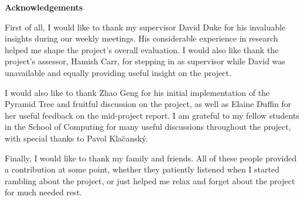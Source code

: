 \begin{center}
    {\LARGE\bf Acknowledgements}
\end{center}

First of all, I would like to thank my supervisor David Duke for his invaluable insights during our weekly meetings. His considerable experience in research helped me shape the project's overall evaluation. I would also like thank the project's assessor, Hamish Carr, for stepping in as supervisor while David was unavailable and equally providing useful insight on the project.

I would also like to thank  Zhao Geng for his initial implementation of the Pyramid Tree and fruitful discussion on the project, as well as Elaine Duffin for her useful feedback on the mid-project report. I am grateful to my fellow students in the School of Computing for many useful discussions throughout the project, with special thanks to Pavol Kla\u{c}ansk\'{y}.


Finally, I would like to thank my family and friends. All of these people provided a contribution at some point, whether they patiently listened when I started rambling about the project, or just helped me relax and forget about the project for much needed rest.


